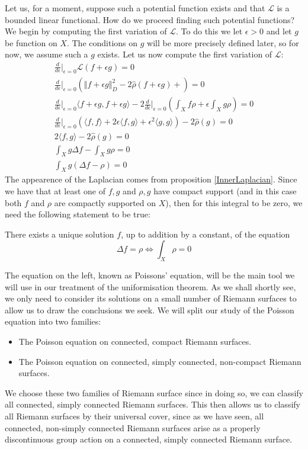 \documentclass[11pt]{report}
\theoremstyle{definition}
\begin{document}
Let us, for a moment, suppose such a potential function exists and that $\mathcal{L}$ is a bounded linear functional. How do we proceed finding such potential functions?
We begin by computing the first variation of $\mathcal{L}$. To do this we let $\epsilon > 0$ and let $g$ be function on $X$. The conditions on $g$ will be more precisely defined later, so for now, we assume such a $g$ exists. Let us now compute the first variation of $\mathcal{L}$:
\begin{gather*}
  \frac{d}{d\epsilon}\biggr\rvert_{\epsilon = 0}\mathcal{L}(f+\epsilon g) = 0 \\
  \frac{d}{d\epsilon}\biggr\rvert_{\epsilon = 0}(\Vert f+\epsilon g\Vert _D^2 -2\hat{\rho}(f+\epsilon g) +) = 0 \\
  \frac{d}{d\epsilon}\biggr\rvert_{\epsilon = 0} \langle f + \epsilon g, f + \epsilon g \rangle -2\frac{d}{d\epsilon}\biggr\rvert_{\epsilon = 0}(\int_X f\rho  + \epsilon \int_X g\rho) = 0 \\
  \frac{d}{d\epsilon}\biggr\rvert_{\epsilon = 0}(\langle f, f \rangle + 2\epsilon \langle f, g \rangle +\epsilon^2 \langle g, g \rangle) -2 \hat{\rho}(g) = 0 \\
  2\langle f, g \rangle -2\hat{\rho}(g) = 0 \\
  \int_X g\Delta f - \int_X g\rho = 0 \\
  \int_X g(\Delta f - \rho) = 0 
\end{gather*}
The appearence of the Laplacian comes from proposition \ref{InnerLaplacian}.
Since we have that at least one of $f,g$ and $\rho,g$ have compact support (and in this case both $f$ and $\rho$ are compactly supported on $X$), then for this integral to be zero, we need the following statement to be true:

There exists a unique solution $f$, up to addition by a constant, of the equation 
\[ \Delta f = \rho \Longleftrightarrow \int_X \rho = 0\]

The equation on the left, known as Poissons' equation, will be the main tool we will use in our treatment of the uniformisation theorem. As we shall shortly see, we only need to consider its solutions on a small number of Riemann surfaces to allow us to draw the conclusions we seek. We will split our study of the Poisson equation into two families:
\begin{itemize}
  \item The Poisson equation on connected, compact Riemann surfaces.
  \item The Poisson equation on connected, simply connected, non-compact Riemann surfaces.
\end{itemize}
We choose these two families of Riemann surface since in doing so, we can classify all connected, simply connected Riemann surfaces. This then allows us to classify all Riemann surfaces by their universal cover, since as we have seen, all connected, non-simply connected Riemann surfaces arise as a properly discontinuous group action on a connected, simply connected Riemann surface.
\end{document}
